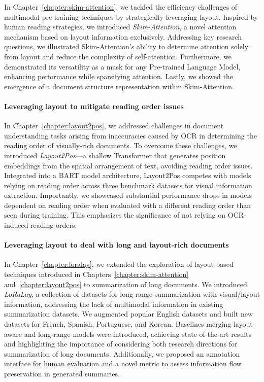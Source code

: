 In Chapter~\ref{chapter:skim-attention}, we tackled the efficiency challenges of multimodal pre-training techniques by strategically leveraging layout. Inspired by human reading strategies, we introduced \textit{Skim-Attention}, a novel attention mechanism based on layout information exclusively. Addressing key research questions, we illustrated Skim-Attention's ability to determine attention solely from layout and reduce the complexity of self-attention. Furthermore, we demonstrated its versatility as a mask for any Pre-trained Language Model, enhancing performance while sparsifying attention. Lastly, we showed the emergence of a document structure representation within Skim-Attention.

\paragraph{Leveraging layout to mitigate reading order issues}

In Chapter~\ref{chapter:layout2pos}, we addressed challenges in document understanding tasks arising from inaccuracies caused by \ac{OCR} in determining the reading order of visually-rich documents. To overcome these challenges, we introduced \textit{Layout2Pos}—a shallow Transformer that generates position embeddings from the spatial arrangement of text, avoiding reading order issues. Integrated into a \ac{BART} model \citep{lewis2019bart} architecture, Layout2Pos competes with models relying on reading order across three benchmark datasets for visual information extraction. Importantly, we showcased substantial performance drops in models dependent on reading order when evaluated with a different reading order than seen during training. This emphasizes the significance of not relying on \ac{OCR}-induced reading orders. 

\paragraph{Leveraging layout to deal with long and layout-rich documents}

In Chapter~\ref{chapter:loralay}, we extended the exploration of layout-based techniques introduced in Chapters~\ref{chapter:skim-attention} and~\ref{chapter:layout2pos} to summarization of long documents. We introduced \textit{LoRaLay}, a collection of datasets for long-range summarization with visual/layout information, addressing the lack of multimodal information in existing summarization datasets. We augmented popular English datasets and built new datasets for French, Spanish, Portuguese, and Korean. Baselines merging layout-aware and long-range models were introduced, achieving state-of-the-art results and highlighting the importance of considering both research directions for summarization of long documents. Additionally, we proposed an annotation interface for human evaluation and a novel metric to assess information flow preservation in generated summaries.

